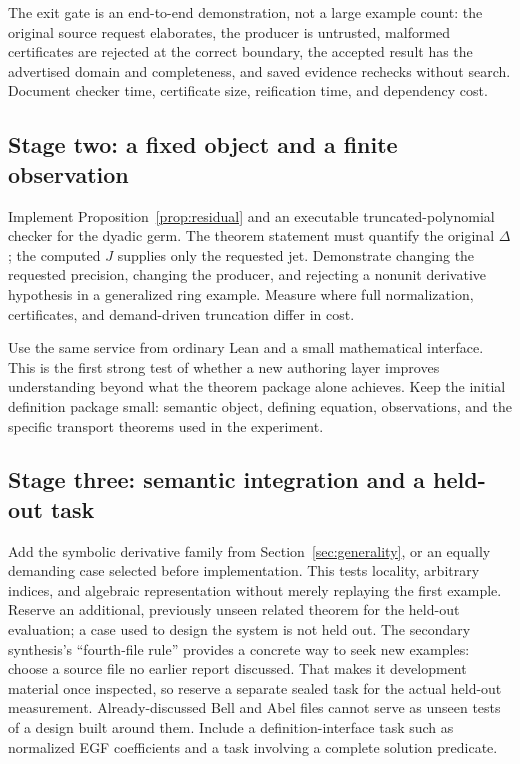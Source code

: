 \documentclass[11pt,letterpaper]{article}
\begin{document}
The exit gate is an end-to-end demonstration, not a large example count: the
original source request elaborates, the producer is untrusted, malformed
certificates are rejected at the correct boundary, the accepted result has the
advertised domain and completeness, and saved evidence rechecks without search.
Document checker time, certificate size, reification time, and dependency cost.

\subsection{Stage two: a fixed object and a finite observation}
Implement Proposition~\ref{prop:residual} and an executable truncated-polynomial
checker for the dyadic germ. The theorem statement must quantify the original
\(\Delta\); the computed \(J\) supplies only the requested jet. Demonstrate
changing the requested precision, changing the producer, and rejecting a
nonunit derivative hypothesis in a generalized ring example. Measure where
full normalization, certificates, and demand-driven truncation differ in cost.

Use the same service from ordinary Lean and a small mathematical interface.
This is the first strong test of whether a new authoring layer improves
understanding beyond what the theorem package alone achieves. Keep the initial
definition package small: semantic object, defining equation, observations,
and the specific transport theorems used in the experiment.

\subsection{Stage three: semantic integration and a held-out task}
Add the symbolic derivative family from Section~\ref{sec:generality}, or an
equally demanding case selected before implementation. This tests locality,
arbitrary indices, and algebraic representation without merely replaying the
first example. Reserve an additional, previously unseen related theorem for the
held-out evaluation; a case used to design the system is not held out.
The secondary synthesis's ``fourth-file rule'' provides a concrete way to seek
new examples: choose a source file no earlier report discussed. That makes it
development material once inspected, so reserve a separate sealed task for the
actual held-out measurement. Already-discussed Bell and Abel files cannot serve
as unseen tests of a design built around them.
Include a definition-interface task such as normalized EGF
coefficients and a task involving a complete solution predicate.
\end{document}
